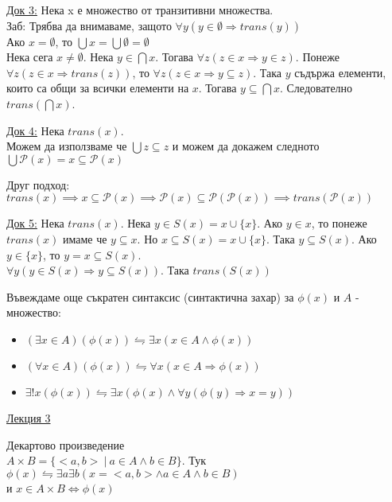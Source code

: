 \documentclass[fleqn, titlepage, 12pt]{report}
\begin{document}
\underline{Док 3:} Нека x е множество от транзитивни множества.\\
Заб: Трябва да внимаваме, защото $ \forall{y} (y \in \emptyset \Rightarrow trans(y) )$\\
Ако $x = \emptyset $, то $ \bigcup{x} = \bigcup{ \emptyset } = \emptyset $\\
Нека сега $x \neq \emptyset $. Нека $y \in \bigcap{x}$. Тогава $ \forall{z} (z \in x \Rightarrow y \in z)$.
Понеже $ \forall{z} (z \in x \Rightarrow trans(z) )$, то $ \forall{z} (z \in x \Rightarrow y \subseteq z)$.
Така $y$ съдържа елементи, които са общи за всички елементи на $x$. Тогава $y \subseteq \bigcap{x} $.
Следователно $ trans( \bigcap{x} )$.
\bigbreak

\underline{Док 4:} Нека $trans(x)$.\\
Можем да използваме че $ \bigcup{z} \subseteq z$
и можем да докажем следното $ \bigcup{ \mathcal{P}(x) = x \subseteq \mathcal{P}(x) } $
\bigbreak

Друг подход:\\
$trans(x) \implies x \subseteq \mathcal{P}(x) \implies \mathcal{P}(x) \subseteq \mathcal{P}(
\mathcal{P}(x) ) \implies trans( \mathcal{P}(x)
)$
\bigbreak

\underline{Док 5:} Нека $trans(x)$. Нека $y \in S(x) = x \cup \{ x\}$.
Ако $y \in x$, то понеже $trans(x)$ имаме че $y \subseteq x$. Но $x \subseteq S(x) = x \cup \{ x\}$.
Така $y \subseteq S(x)$. Ако $y \in \{ x\}$, то $y = x \subseteq S(x)$.\\
$ \forall{y} (y \in S(x) \Rightarrow y \subseteq S(x))$. Така $trans(S(x))$
\bigbreak

Въвеждаме още съкратен синтаксис (синтактична захар) за $ \phi(x)$ и $A$ - множество:
\begin{itemize}
  \item $ (\exists{x \in A}) ( \phi(x)) \leftrightharpoons \exists{x} (x \in A \land \phi(x) )$
  \item $ (\forall{x \in A}) ( \phi(x)) \leftrightharpoons \forall{x} (x \in A \Rightarrow \phi(x) )$
  \item $ \exists{!x} ( \phi(x) ) \leftrightharpoons \exists{x} ( \phi(x) \land \forall{y} ( \phi(y) \Rightarrow x = y))$
\end{itemize}

\clearpage
\begin{center}
  \underline{\huge\normalfont Лекция 3}
\end{center}
\bigbreak

 Декартово произведение\\
$A \times B = \{<a,b>\ |\ a \in A \land b \in B\}$.
Тук $ \phi(x) \leftrightharpoons \exists{a} \exists{b} ( x = <a,b> \land a \in A \land b \in B)$\\
и $ x \in A \times B \Leftrightarrow \phi(x) $
\bigbreak
\end{document}
